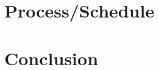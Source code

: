 \documentclass{article}
\begin{document}

\section*{Process/Schedule}

\section*{Conclusion}




\end{document}
